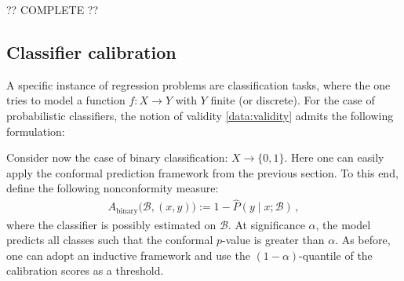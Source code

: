     ?? COMPLETE ??

\subsection{Classifier calibration}

    A specific instance of regression problems are classification tasks, where the one tries to model a function $f:X\rightarrow Y$ with $Y$ finite (or discrete). For the case of probabilistic classifiers, the notion of validity \ref{data:validity} admits the following formulation:

    Consider now the case of binary classification: $X\rightarrow\{0,1\}$. Here one can easily apply the conformal prediction framework from the previous section. To this end, define the following nonconformity measure:
    \begin{gather}
        A_\text{binary}\big(\mathcal{B},(x,y)\big) := 1 - \hat{P}(y\mid x;\mathcal{B})\,,
    \end{gather}
    where the classifier is possibly estimated on $\mathcal{B}$. At significance $\alpha$, the model predicts all classes such that the conformal $p$-value is greater than $\alpha$. As before, one can adopt an inductive framework and use the $(1-\alpha)$-quantile of the calibration scores as a threshold.


